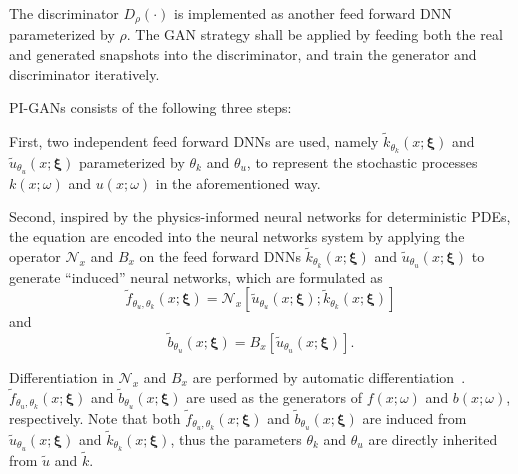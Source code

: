 \documentclass[conference,compsoc]{IEEEtran}
\begin{document}
The discriminator $D_{\rho}(\cdot)$ is implemented as another feed forward DNN parameterized by $\rho$. The GAN strategy shall be applied by feeding both the real and generated snapshots into the discriminator, and train the generator and discriminator iteratively\cite{yang2018physics}.

PI-GANs consists of the following three steps:

First, two independent feed forward DNNs are used, namely $\tilde{k}_{\theta_k}(x;\boldsymbol{\xi} )$ and $\tilde{u}_{\theta_u}(x;\boldsymbol{\xi} )$ parameterized by $\theta_k$ and $\theta_u$, to represent the stochastic processes $k(x;\omega)$ and $u(x;\omega)$ in the aforementioned way.

Second, inspired by the physics-informed neural networks for deterministic PDEs\cite{yang2018physics}, the equation are encoded into the neural networks system by applying the operator $\mathcal{N}_x$ and $B_x$ on the feed forward DNNs $\tilde{k}_{\theta_k}(x;\boldsymbol{\xi} )$ and $\tilde{u}_{\theta_u}(x;\boldsymbol{\xi} )$ to generate ``induced'' neural networks, which are formulated as
\begin{equation} 
\tilde{f}_{\theta_u, \theta_k}(x;\boldsymbol{\xi}) = \mathcal{N}_x [\tilde{u}_{\theta_u}(x;\boldsymbol{\xi}); \tilde{k}_{\theta_k}(x;\boldsymbol{\xi})]
\end{equation}
and 
\begin{equation} 
\tilde{b}_{\theta_u}(x;\boldsymbol{\xi}) =B_x[\tilde{u}_{\theta_u}(x;\boldsymbol{\xi})].
\end{equation}

Differentiation in $\mathcal{N}_x$ and $B_x$ are performed by automatic differentiation~\cite{baydin2018automatic}. $\tilde{f}_{\theta_u, \theta_k}(x;\boldsymbol{\xi})$ and $\tilde{b}_{\theta_u}(x;\boldsymbol{\xi})$ are used as the generators of $f(x;\omega)$ and $b(x;\omega)$, respectively. Note that both $\tilde{f}_{\theta_u, \theta_k}(x;\boldsymbol{\xi})$ and $\tilde{b}_{\theta_u}(x;\boldsymbol{\xi})$ are induced from $\tilde{u}_{\theta_u}(x;\boldsymbol{\xi})$ and $\tilde{k}_{\theta_k}(x;\boldsymbol{\xi})$, thus the parameters $\theta_k$ and $\theta_u$ are directly inherited from $\tilde{u}$ and $\tilde{k}$.
\end{document}
